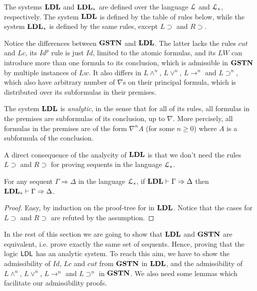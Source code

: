 The systems $\mathbf{LDL}$ and $\mathbf{LDL}_*$ are defined over the language $\mathcal{L}$ and $\mathcal{L}_*$, respectively. The system $\mathbf{LDL}$ is defined by the table of rules below, while the system $\mathbf{LDL}_*$ is defined by the same rules, except $L \supset$ and $R \supset$.


\begin{rem}\label{rem:ldl-gstn}
  Notice the differences between $\mathbf{GSTN}$ and $\mathbf{LDL}$. The latter lacks the rules $cut$ and $Lc$, its $Id ^p$ rule is just $Id$, limited to the atomic formulas, and its $LW$ can introduce more than one formula to its conclusion, which is admissible in $\mathbf{GSTN}$ by multiple instances of $Lw$. It also differs in $L \wedge ^n$, $L \vee ^n$, $L \rightarrow ^n$ and $L \supset ^n$, which also have arbitrary number of $\nabla$s on their principal formula, which is distributed over its subformulas in their premises.  
\end{rem}

\begin{rem}
  The system $\mathbf{LDL}$ is \emph{analytic}, in the sense that for all of its rules, all formulas in the premises are subformulas of its conclusion, up to $\nabla$. More percisely, all formulas in the premises are of the form $\nabla^n A$ (for some $n \geq 0$) where $A$ is a subformula of the conclusion.
\end{rem}

A direct consequence of the analycity of $\mathbf{LDL}$ is that we don't need the rules $L \supset$ and $R \supset$ for proving sequents in the language $\mathcal{L}_*$.

\begin{thm}\label{thm:ldl-cons-ext}
  For any sequent $\Gamma \Rightarrow \Delta$ in the language $\mathcal{L}_*$, if $\mathbf{LDL} \vdash \Gamma \Rightarrow \Delta$ then $\mathbf{LDL}_* \vdash \Gamma \Rightarrow \Delta$.
\end{thm}
\begin{proof}
  Easy, by induction on the proof-tree for in $\mathbf{LDL}$. Notice that the cases for $L \supset$ and $R \supset$ are refuted by the assumption.
\end{proof}

In the rest of this section we are going to show that $\mathbf{LDL}$ and $\mathbf{GSTN}$ are equivalent, i.e. prove exactly the same set of sequents. Hence, proving that the logic $\mathsf{LDL}$ has an analytic system. To reach this aim, we have to show the admissibility of $Id$, $Lc$ and $cut$ from $\mathbf{GSTN}$ in $\mathbf{LDL}$, and the admissibility of $L \wedge ^n$, $L \vee ^n$, $L \rightarrow ^n$ and $L \supset ^n$ in $\mathbf{GSTN}$. We also need some lemmas which facilitate our admissibility proofs.


